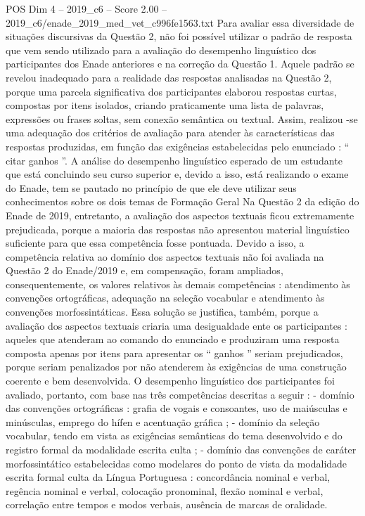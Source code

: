 \begin{textsample}{POS Dim 4 – 2019\_c6 – Score 2.00 – 2019\_c6/enade\_2019\_med\_vet\_c996fe1563.txt}
Para avaliar essa diversidade de situações discursivas da Questão 2, não foi possível utilizar o padrão de resposta que vem sendo utilizado para a avaliação do desempenho linguístico dos participantes dos Enade anteriores e na correção da Questão 1.
Aquele padrão se revelou inadequado para a realidade das respostas analisadas na Questão 2, porque uma parcela significativa dos participantes elaborou respostas curtas, compostas por itens isolados, criando praticamente uma lista de palavras, expressões ou frases soltas, sem conexão semântica ou textual.
Assim, realizou -se uma adequação dos critérios de avaliação para atender às características das respostas produzidas, em função das exigências estabelecidas pelo enunciado : “ citar ganhos ”.
A análise do desempenho linguístico esperado de um estudante que está concluindo seu curso superior e, devido a isso, está realizando o exame do Enade, tem se pautado no princípio de que ele deve utilizar seus conhecimentos sobre os dois temas de Formação Geral Na Questão 2 da edição do Enade de 2019, entretanto, a avaliação dos aspectos textuais ficou extremamente prejudicada, porque a maioria das respostas não apresentou material linguístico suficiente para que essa competência fosse pontuada.
Devido a isso, a competência relativa ao domínio dos aspectos textuais não foi avaliada na Questão 2 do Enade/2019 e, em compensação, foram ampliados, consequentemente, os valores relativos às demais competências : atendimento às convenções ortográficas, adequação na seleção vocabular e atendimento às convenções morfossintáticas.
Essa solução se justifica, também, porque a avaliação dos aspectos textuais criaria uma desigualdade ente os participantes : aqueles que atenderam ao comando do enunciado e produziram uma resposta composta apenas por itens para apresentar os “ ganhos ” seriam prejudicados, porque seriam penalizados por não atenderem às exigências de uma construção coerente e bem desenvolvida.
O desempenho linguístico dos participantes foi avaliado, portanto, com base nas três competências descritas a seguir : - domínio das convenções ortográficas : grafia de vogais e consoantes, uso de maiúsculas e minúsculas, emprego do hífen e acentuação gráfica ; - domínio da seleção vocabular, tendo em vista as exigências semânticas do tema desenvolvido e do registro formal da modalidade escrita culta ; - domínio das convenções de caráter morfossintático estabelecidas como modelares do ponto de vista da modalidade escrita formal culta da Língua Portuguesa : concordância nominal e verbal, regência nominal e verbal, colocação pronominal, flexão nominal e verbal, correlação entre tempos e modos verbais, ausência de marcas de oralidade.

\end{textsample}
